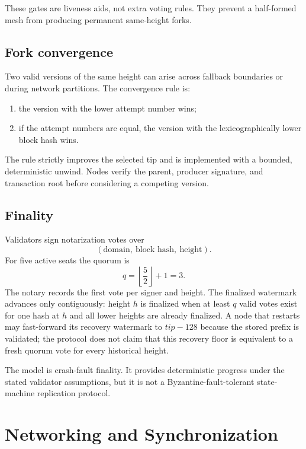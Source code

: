 \documentclass[11pt,a4paper]{article}
\begin{document}
These gates are liveness aids, not extra voting rules. They prevent a
half-formed mesh from producing permanent same-height forks.

\subsection{Fork convergence}

Two valid versions of the same height can arise across fallback boundaries or
during network partitions. The convergence rule is:
\begin{enumerate}[leftmargin=*]
  \item the version with the lower attempt number wins;
  \item if the attempt numbers are equal, the version with the
        lexicographically lower block hash wins.
\end{enumerate}
The rule strictly improves the selected tip and is implemented with a
bounded, deterministic unwind. Nodes verify the parent, producer signature,
and transaction root before considering a competing version.

\subsection{Finality}

Validators sign notarization votes over
\[
  (\text{domain},\ \text{block hash},\ \text{height}).
\]
For five active seats the quorum is
\begin{equation}
  q = \left\lfloor \frac{5}{2} \right\rfloor + 1 = 3.
\end{equation}
The notary records the first vote per signer and height. The finalized
watermark advances only contiguously: height $h$ is finalized when at least
$q$ valid votes exist for one hash at $h$ and all lower heights are already
finalized. A node that restarts may fast-forward its recovery watermark to
$tip-128$ because the stored prefix is validated; the protocol does not claim
that this recovery floor is equivalent to a fresh quorum vote for every
historical height.

The model is crash-fault finality. It provides deterministic progress under
the stated validator assumptions, but it is not a Byzantine-fault-tolerant
state-machine replication protocol.

\section{Networking and Synchronization}
\end{document}
